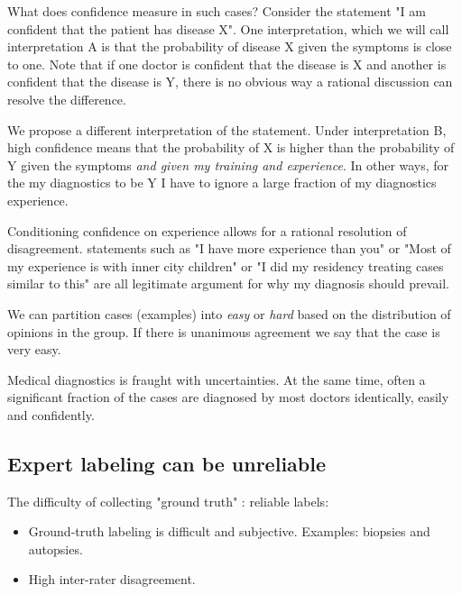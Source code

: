 \documentclass[fleqn,10pt]{wlscirep}
\begin{document}
What does confidence measure in such cases? Consider the statement "I am confident that the patient has disease X".
One interpretation, which we will call interpretation A is that the probability of disease X given the symptoms is close to one. Note that if one doctor is confident that the disease is X and another is confident that the disease is Y, there is no obvious way a rational discussion can resolve the difference.

We propose a different interpretation of the statement. Under interpretation B, high confidence means that the probability of X is higher than the probability of Y given the symptoms {\em and given my training and experience}. In other ways, for the my diagnostics to be Y I have to ignore a large fraction of my diagnostics experience.

Conditioning confidence on experience allows for a rational resolution of disagreement. statements such as
"I have more experience than you" or "Most of my experience is with inner city children" or "I did my residency treating cases similar to this" are all legitimate argument for why my diagnosis should prevail.



We can partition cases (examples) into {\em easy} or {\em hard} based on the distribution of opinions in the group. If  there is unanimous agreement we say that the case is very easy. 


Medical diagnostics is fraught with uncertainties. At the same time, often a significant fraction of the cases are diagnosed by most doctors identically, easily and confidently.



\subsection*{Expert labeling can be unreliable \label{sec:UnreliableExperts}}
The difficulty of collecting "ground truth" : reliable labels:
\begin{itemize}
    \item Ground-truth labeling is difficult and subjective. Examples: biopsies and autopsies.
    \item High inter-rater disagreement.
\end{itemize}
\end{document}
